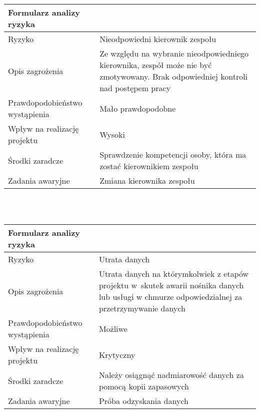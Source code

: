 \documentclass{article}
\begin{document}
\begin{tabular}{|L{6cm}|L{9cm}|}
\hline
Formularz analizy ryzyka &  \\
\hline
Ryzyko 						   & Nieodpowiedni kierownik zespołu \\
\hline
Opis zagrożenia				   & Ze względu na wybranie nieodpowiedniego kierownika, zespół może nie być zmotywowany. Brak odpowiedniej kontroli nad postępem pracy \\
\hline
Prawdopodobieństwo wystąpienia & Mało prawdopodobne \\
\hline
Wpływ na realizację projektu   & Wysoki \\
\hline
Środki zaradcze				   & Sprawdzenie kompetencji osoby, która ma zostać kierownikiem zespołu \\
\hline
Zadania awaryjne			   & Zmiana kierownika zespołu \\
\hline
\end{tabular}

\mbox{}\\\mbox{}\\

\begin{tabular}{|L{6cm}|L{9cm}|}
\hline
Formularz analizy ryzyka &  \\
\hline
Ryzyko 						   & Utrata danych \\
\hline
Opis zagrożenia				   & Utrata danych na którymkolwiek z etapów projektu w~skutek awarii nośnika danych lub usługi w chmurze odpowiedzialnej za przetrzymywanie danych \\
\hline
Prawdopodobieństwo wystąpienia & Możliwe \\
\hline
Wpływ na realizację projektu   & Krytyczny \\
\hline
Środki zaradcze				   & Należy osiągnąć nadmiarowość danych za pomocą kopii zapasowych     \\
\hline
Zadania awaryjne			   & Próba odzyskania danych \\
\hline
\end{tabular}

\mbox{}\\\mbox{}\\
\end{document}
